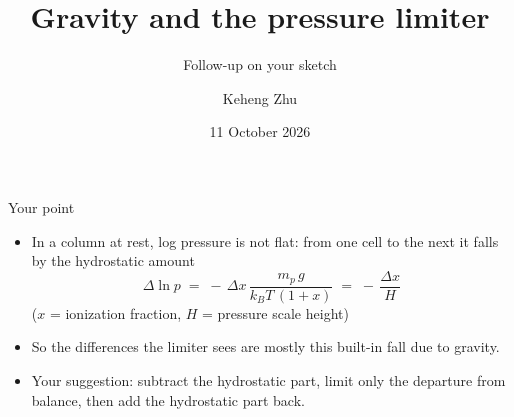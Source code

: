 \documentclass[aspectratio=169,11pt]{beamer}
\title{Gravity and the pressure limiter}
\subtitle{Follow-up on your sketch}
\author{Keheng Zhu}
\date{11 October 2026}
\begin{document}
\begin{frame}
  \titlepage
\end{frame}

\begin{frame}{Your point}
  \begin{itemize}
    \item In a column at rest, log pressure is \alert{not flat}:
          from one cell to the next it falls by the hydrostatic amount
          \[
            \Delta \ln p \;=\; -\,\Delta x\,\frac{m_p\, g}{k_B T\,(1+x)}
            \;=\; -\,\frac{\Delta x}{H}
          \]
          {\small ($x$ = ionization fraction, $H$ = pressure scale height)}
    \item So the differences the limiter sees are mostly this built-in fall due to gravity.
    \item Your suggestion: subtract the hydrostatic part, \alert{limit only the departure}
          from balance, then add the hydrostatic part back.
  \end{itemize}
\end{frame}
\end{document}
